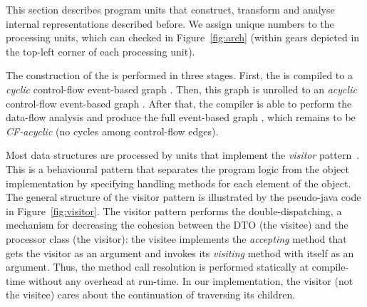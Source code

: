 This section describes program units that construct, transform and analyse internal representations described before. %
We assign unique numbers to the processing units, which can checked in Figure~\ref{fig:arch} (within gears depicted in the top-left corner of each processing unit).

The construction of the \xgraph{} is performed in three stages.
First, the \ytree{} is compiled to a \textit{cyclic} control-flow event-based graph \xgraph[CF].
Then, this graph is unrolled to an \textit{acyclic} control-flow event-based graph \xgraphU[CF].
After that, the compiler is able to perform the data-flow analysis and produce the full event-based graph \xgraphU[CF+DF], which remains to be \textit{CF-acyclic} (no cycles among control-flow edges).

Most data structures are processed by units that implement the \textit{visitor} pattern~\cite{palsberg1998essence}.
This is a behavioural pattern that separates the program logic from the object implementation by specifying handling methods for each element of the object.
The general structure of the visitor pattern is illustrated by the pseudo-java code in Figure~\ref{fig:visitor}.
The visitor pattern performs the double-dispatching, a mechanism for decreasing the cohesion between the DTO (the visitee) and the processor class (the visitor): the visitee implements the \textit{accepting} method that gets the visitor as an argument and invokes its \textit{visiting} method with itself as an argument.
Thus, the method call resolution is performed statically at compile-time without any overhead at run-time.
In our implementation, the visitor (not the visitee) cares about the continuation of traversing its children.

